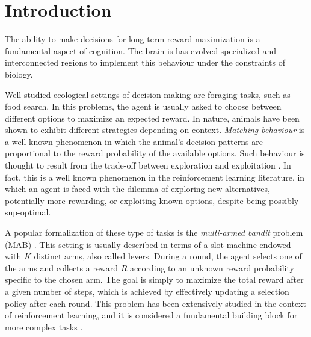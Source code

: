 
\section{Introduction}
\hfill \break
\vspace {0.5cm}

The ability to make decisions for long-term reward maximization is a fundamental aspect of cognition. The brain is has evolved specialized and interconnected regions to implement this behaviour under the constraints of biology.

Well-studied ecological settings of decision-making are foraging tasks, such as food search. In this problems, the agent is usually asked to choose between different options to maximize an expected reward.
In nature, animals have been shown to exhibit different strategies depending on context.
\textit{Matching behaviour} is a well-known phenomenon in which the animal's decision patterns are proportional to the reward probability of the available options.
Such behaviour is thought to result from the trade-off between exploration and exploitation \cite{suttonReinforcementLearningProblem1998, nivEvolutionReinforcementLearning2002}.
In fact, this is a well known phenomenon in the reinforcement learning literature, in which an agent is faced with the dilemma of exploring new alternatives, potentially more rewarding, or exploiting known options, despite being possibly sup-optimal.

A popular formalization of these type of tasks is the \textit{multi-armed bandit} problem (MAB) \cite{averbeckTheoryChoiceBandit2015}. This setting is usually described in terms of a slot machine endowed with $K$ distinct arms, also called levers.
During a round, the agent selects one of the arms and collects a reward $R$ according to an unknown reward probability specific to the chosen arm.
The goal is simply to maximize the total reward after a given number of steps, which is achieved by effectively updating a selection policy after each round.
This problem has been extensively studied in the context of reinforcement learning, and it is considered a fundamental building block for more complex tasks \cite{suttonReinforcementLearningProblem1998}.

